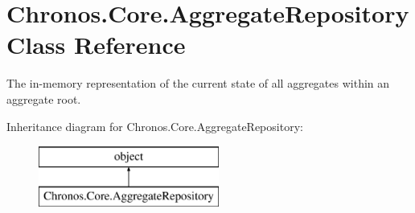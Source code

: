 \hypertarget{classChronos_1_1Core_1_1AggregateRepository}{}\section{Chronos.\+Core.\+Aggregate\+Repository Class Reference}
\label{classChronos_1_1Core_1_1AggregateRepository}


The in-\/memory representation of the current state of all aggregates within an aggregate root.  


Inheritance diagram for Chronos.\+Core.\+Aggregate\+Repository\+:\begin{figure}[H]
\begin{center}
\leavevmode
\includegraphics[height=2.000000cm]{classChronos_1_1Core_1_1AggregateRepository}
\end{center}
\end{figure}
